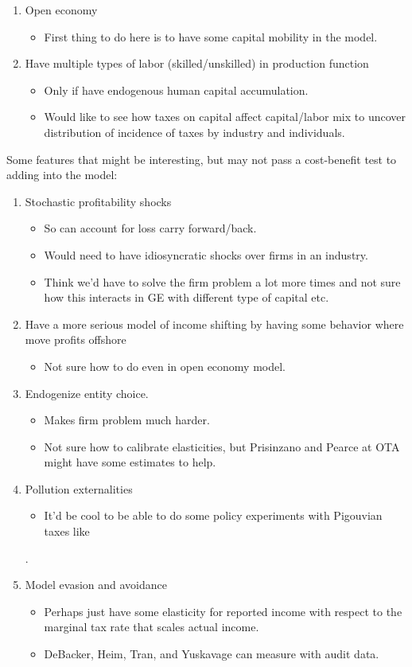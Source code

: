 \documentclass[article,11pt,letterpaper,fleqn]{article}
\theoremstyle{definition}
\numberwithin{equation}{section}
\newcommand{\cn}{\citeasnoun} %
\begin{document}
\begin{enumerate}
\begin{itemize}
	\end{itemize}	
\item Open economy	
	\begin{itemize}
	\item First thing to do here is to have some capital mobility in the model.	
	\end{itemize}
\item Have multiple types of labor (skilled/unskilled) in production function	
	\begin{itemize}
	\item Only if have endogenous human capital accumulation.  
	\item Would like to see how taxes on capital affect capital/labor mix to uncover distribution of incidence of taxes by industry and individuals.	
	\end{itemize}
\end{enumerate}


Some features that might be interesting, but may not pass a cost-benefit test to adding into the model:	
\begin{enumerate}
\item Stochastic profitability shocks	
	\begin{itemize}
	\item So can account for loss carry forward/back.
	\item Would need to have idiosyncratic shocks over firms in an industry.   
	\item Think we'd have to solve the firm problem a lot more times and not sure how this interacts in GE with different type of capital etc.
	\end{itemize}
\item Have a more serious model of income shifting by having some behavior where move profits offshore	
	\begin{itemize}
	\item Not sure how to do even in open economy model.	
	\end{itemize}
\item Endogenize entity choice.		
	\begin{itemize}
	\item Makes firm problem much harder.  
	\item Not sure how to calibrate elasticities, but Prisinzano and Pearce at OTA might have some estimates to help.
	\end{itemize}
\item Pollution externalities	
	\begin{itemize}
	\item It'd be cool to be able to do some policy experiments with Pigouvian taxes like \cn{BM1983}
	\end{itemize}.	
\item Model evasion and avoidance	
	\begin{itemize}
	\item Perhaps just have some elasticity for reported income with respect to the marginal tax rate that scales actual income.	
	\item DeBacker, Heim, Tran, and Yuskavage can measure with audit data.
	\end{itemize}
\end{enumerate}


\end{document}

